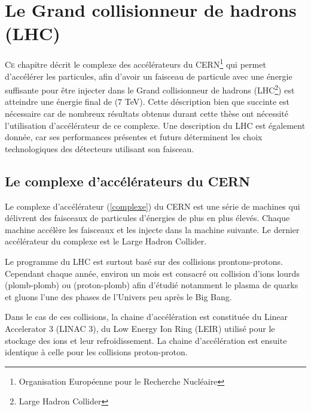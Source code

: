 \chapter{Le Grand collisionneur de hadrons (LHC)}
\renewcommand\chapterillustration{LHC/lhc}
\ThisULCornerWallPaper{1}{\chapterillustration}
\minitoc
\vspace{1cm}
\lettrine[lines=4, slope=-0.5em]{C}{e} chapitre décrit le complexe des accélérateurs du CERN\footnote{Organisation Européenne pour le Recherche Nucléaire} qui permet d'accélérer les particules, afin d'avoir un faisceau de particule avec une énergie suffisante pour être injecter dans le Grand collisionneur de hadrons (LHC\footnote{Large Hadron Collider}) est atteindre une énergie final de ($7$ TeV). Cette déscription bien que succinte est nécessaire car de nombreux résultats obtenus durant cette thèse ont nécessité l'utilisation d'accélérateur de ce complexe. Une description du LHC est également donnée, car ses performances présentes et futurs déterminent les choix technologiques des détecteurs utilisant son faisceau.

\section{Le complexe d'accélérateurs du CERN}

Le complexe d'accélérateur (\ref{complexe}) du CERN est une série de machines qui délivrent des faisceaux de particules d'énergies de plus en plus élevés. Chaque machine accélère les faisceaux et les injecte dans la machine suivante. Le dernier accélérateur du complexe est le Large Hadron Collider.

Le programme du LHC est surtout basé sur des collisions prontons-protons. Cependant chaque année, environ un mois est consacré ou collision d'ions lourds (plomb-plomb) ou (proton-plomb) afin d'étudié notamment le plasma de quarks et gluons l'une des phases de l'Univers peu après le Big Bang. 

Dans le cas de ces collisions, la chaine d'accélération est constituée du Linear Accelerator 3 (LINAC 3), du Low Energy Ion Ring (LEIR) utilisé pour le stockage des ions et leur refroidissement. La chaine d'accélération est ensuite identique à celle pour les collisions proton-proton.

